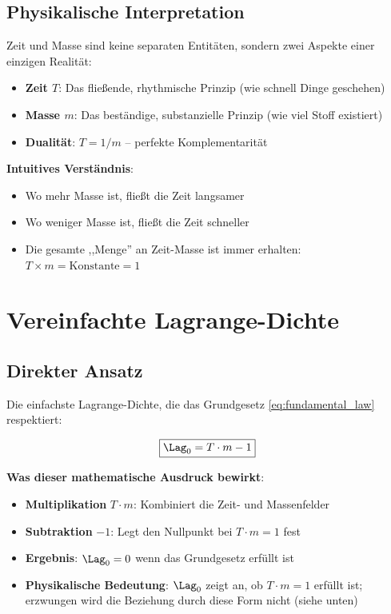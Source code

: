 	\subsection{Physikalische Interpretation}
	
	\begin{definition}
		Zeit und Masse sind keine separaten Entitäten, sondern zwei Aspekte einer einzigen Realität:
		\begin{itemize}
			\item \textbf{Zeit $T$}: Das fließende, rhythmische Prinzip (wie schnell Dinge geschehen)
			\item \textbf{Masse $m$}: Das beständige, substanzielle Prinzip (wie viel Stoff existiert)
			\item \textbf{Dualität}: $T = 1/m$ -- perfekte Komplementarität
		\end{itemize}
	\end{definition}
	
	\textbf{Intuitives Verständnis}: 
	\begin{itemize}
		\item Wo mehr Masse ist, fließt die Zeit langsamer
		\item Wo weniger Masse ist, fließt die Zeit schneller  
		\item Die gesamte ,,Menge'' an Zeit-Masse ist immer erhalten: $T \times m = \text{Konstante} = 1$
	\end{itemize}
	
	\section{Vereinfachte Lagrange-Dichte}
	
	\subsection{Direkter Ansatz}
	
	Die einfachste Lagrange-Dichte, die das Grundgesetz \eqref{eq:fundamental_law} respektiert:
	
	\begin{equation}
		\boxed{\Lag_0 = T \cdot m - 1}
		\label{eq:simple_lagrangian}
	\end{equation}
	
	\textbf{Was dieser mathematische Ausdruck bewirkt}:
	\begin{itemize}
		\item \textbf{Multiplikation} $T \cdot m$: Kombiniert die Zeit- und Massenfelder
		\item \textbf{Subtraktion} $-1$: Legt den Nullpunkt bei $T \cdot m = 1$ fest
		\item \textbf{Ergebnis}: $\Lag_0 = 0$ wenn das Grundgesetz erfüllt ist
		\item \textbf{Physikalische Bedeutung}: $\Lag_0$ zeigt an, ob $T \cdot m = 1$ erfüllt ist; erzwungen wird die Beziehung durch diese Form nicht (siehe unten)
	\end{itemize}
	
